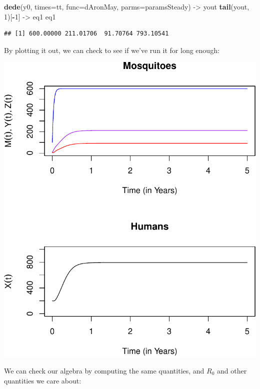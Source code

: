 \documentclass[
]{book}
\newenvironment{Shaded}{\begin{snugshade}}{\end{snugshade}}
\newcommand{\AttributeTok}[1]{\textcolor[rgb]{0.13,0.29,0.53}{#1}}
\newcommand{\DecValTok}[1]{\textcolor[rgb]{0.00,0.00,0.81}{#1}}
\newcommand{\FunctionTok}[1]{\textcolor[rgb]{0.13,0.29,0.53}{\textbf{#1}}}
\newcommand{\NormalTok}[1]{#1}
\newcommand{\OtherTok}[1]{\textcolor[rgb]{0.56,0.35,0.01}{#1}}
\newcommand{\SpecialCharTok}[1]{\textcolor[rgb]{0.81,0.36,0.00}{\textbf{#1}}}
\begin{document}
\begin{Shaded}
\begin{Highlighting}[]
\FunctionTok{dede}\NormalTok{(y0, }\AttributeTok{times=}\NormalTok{tt, }\AttributeTok{func=}\NormalTok{dAronMay, }\AttributeTok{parms=}\NormalTok{paramsSteady) }\OtherTok{{-}\textgreater{}}\NormalTok{ yout}
\FunctionTok{tail}\NormalTok{(yout, }\DecValTok{1}\NormalTok{)[}\SpecialCharTok{{-}}\DecValTok{1}\NormalTok{] }\OtherTok{{-}\textgreater{}}\NormalTok{ eq1 }
\NormalTok{eq1}
\end{Highlighting}
\end{Shaded}

\begin{verbatim}
## [1] 600.00000 211.01706  91.70764 793.10541
\end{verbatim}

By plotting it out, we can check to see if we've run it for long enough:

\includegraphics{_main_files/figure-latex/unnamed-chunk-14-1.pdf}

We can check our algebra by computing the same quantities, and \(R_0\) and other quantities we care about:
\end{document}

